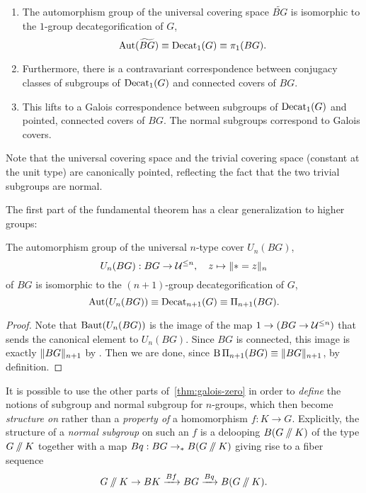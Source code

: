 \begin{thm}
  \label{thm:galois-zero}
  $\phantom{42}$
  \begin{enumerate}
  \item  The automorphism group of the universal covering space
    $\widetilde{BG}$ is isomorphic to
    the $1$-group decategorification of $G$,
    \[
      \Aut(\widetilde{BG}) \equiv \Decat_1(G) \equiv \pi_1(BG).
    \]
  \item Furthermore, there is a contravariant correspondence between
    conjugacy classes of subgroups of $\Decat_1(G)$ and connected
    covers of $BG$.
  \item This lifts to a Galois correspondence between subgroups of
    $\Decat_1(G)$ and pointed, connected covers of $BG$.  The normal
    subgroups correspond to Galois covers.
  \end{enumerate}
\end{thm}
Note that the universal covering space
and the trivial covering space
(constant at the unit type)
are canonically pointed,
reflecting the fact that
the two trivial subgroups are normal.

The first part of the fundamental theorem has a clear generalization to
higher groups:
\begin{thm}
  The automorphism group of the universal $n$-type cover $U_n(BG)$,
  \[
    U_n(BG) : BG \to \UU^{\le n},
    \quad
    z \mapsto \trunc{n}{\pt = z}
  \]
  of $BG$ is
  isomorphic to the $(n+1)$-group decategorification of $G$,
  \[
    \Aut(U_n(BG)) \equiv \Decat_{n+1}(G) \equiv \Pi_{n+1}(BG).
  \]
\end{thm}
\begin{proof}
  Note that
  $\BAut(U_n(BG))$ is the image of the map $1 \to (BG \to \UU^{\le
    n})$ that sends the canonical element to $U_n(BG)$. Since $BG$ is
  connected, this image is exactly $\trunc{n+1}{BG}$ by
  \cite[Theorem~7.1]{joinconstruction}. Then we are done,
  since $\B\Pi_{n+1}(BG) \equiv \trunc{n+1}{BG}$, by definition.
\end{proof}
It is possible to use the other parts
of~\cref{thm:galois-zero} in order to \emph{define} the notions of
subgroup and normal subgroup for $n$-groups, which then become
\emph{structure on} rather than a \emph{property of} a homomorphism $f
: K \to G$.
Explicitly, the structure of a \emph{normal subgroup} on such an $f$
is a delooping $B(G \dblslash K)$ of the type $G \dblslash K$
together with a map $Bq : BG \to_\pt B(G \dblslash K)$ giving rise to a
fiber sequence
\begin{equation}\label{eq:normal-fiber-sequence}
  G \dblslash K \to BK \xrightarrow{Bf}{} BG
  \xrightarrow{Bq}{} B(G \dblslash K).
\end{equation}

